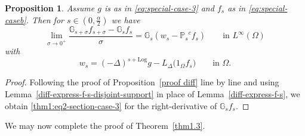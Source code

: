 \documentclass[notitlepage,11pt,reqno]{amsart}
\newtheorem{proposition}[theorem]{Proposition}
\theoremstyle{definition}
\numberwithin{equation}{section}
\newcommand{\cGs}{{\mathbb G}}
\newcommand{\cPs}{{{\mathbb P}_s}}
\begin{document}
    
\begin{proposition}\label{proof diff-case-3}
  Assume $g$ is as in \eqref{eq:special-case-3} and $f_s$ as in \eqref{eq:special-caseb}. Then for $s \in (0,\frac{\alpha}{2})$ we have
    \begin{equation}\label{thm1:eq2-section-case-3}
        \lim_{\sigma \to 0^+} \frac{\cGs_{s+\sigma}f_{s+\sigma}-\cGs_{s} f_s }{\sigma} = \cGs_s (w_s- \cPs^{\! \! c} f_s)\qquad \text{in $L^\infty(\Omega)$}
    \end{equation}
with    
\begin{equation*}
  \label{eq:w-s-simple-case-3}
w_s = (-\Delta)^{s+\mathrm{Log}}g - L_{\Delta}\bigl(1_{\Omega}f_s\bigr) \qquad \text{in $\Omega$.}  
\end{equation*}
\end{proposition}


\begin{proof}
  Following the proof of Proposition~\ref{proof diff} line by line and using Lemma~\ref{diff-express-f-s-disjoint-support} in place of Lemma~\ref{diff-express-f-s}, we obtain \eqref{thm1:eq2-section-case-3} for the right-derivative of $\cGs_s f_s$.
\end{proof}

We may now complete the proof of Theorem~\ref{thm1.3}.
\end{document}

